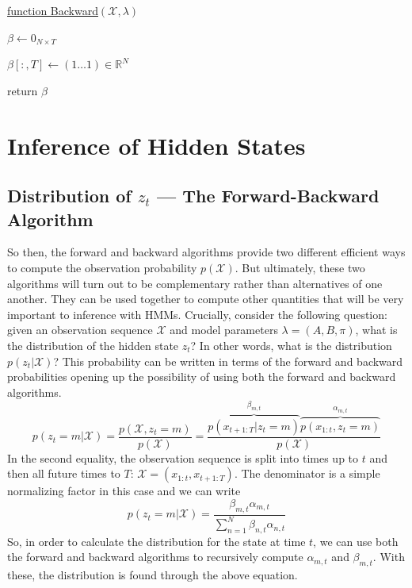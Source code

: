 \documentclass[onecolumn]{gwclass}
\newcommand{\R}{\mathbb{R}}
\begin{document}
	\begin{algorithm}
	\caption{Backward Algorithm --- Vectors}
	
	\underline{function Backward}$(\mathcal{X},\lambda)$\\
	
	$\beta \leftarrow 0_{N\times T}$
	
	$\beta[:,T] \leftarrow (1\dots 1) \in \R^N$
	
	
	return $\beta$
\end{algorithm}
	
	\section{Inference of Hidden States}
	\subsection{Distribution of $z_t$ --- The Forward-Backward Algorithm}
	So then, the forward and backward algorithms provide two different efficient ways to compute the observation probability $p(\mathcal{X})$. But ultimately, these two algorithms will turn out to be complementary rather than alternatives of one another. They can be used together to compute other quantities that will be very important to inference with HMMs. Crucially, consider the following question: given an observation sequence $\mathcal{X}$ and model parameters $\lambda=(A,B,\pi)$, what is the distribution of the hidden state $z_t$? In other words, what is the distribution $p(z_t|\mathcal{X})$? This probability can be written in terms of the forward and backward probabilities opening up the possibility of using both the forward and backward algorithms. 
	$$ p(z_t=m|\mathcal{X})=\frac{p(\mathcal{X},z_t=m)}{p(\mathcal{X})} = \frac{\overbrace{p(x_{t+1:T}|z_t=m)}^{\beta_{m,t}}\overbrace{p(x_{1:t},z_t=m)}^{\alpha_{m,t}}}{p(\mathcal{X})} $$	
	In the second equality, the observation sequence is split into times up to $t$ and then all future times to $T$: $\mathcal{X}=(x_{1:t}, x_{t+1:T})$. The denominator is a simple normalizing factor in this case and we can write
	$$ p(z_t=m|\mathcal{X}) = \frac{\beta_{m,t}\alpha_{m,t}}{\sum_{n=1}^N \beta_{n,t}\alpha_{n,t}} $$
	So, in order to calculate the distribution for the state at time $t$, we can use both the forward and backward algorithms to recursively compute $\alpha_{m,t}$ and $\beta_{m,t}$. With these, the distribution is found through the above equation. 
	
\end{document}
